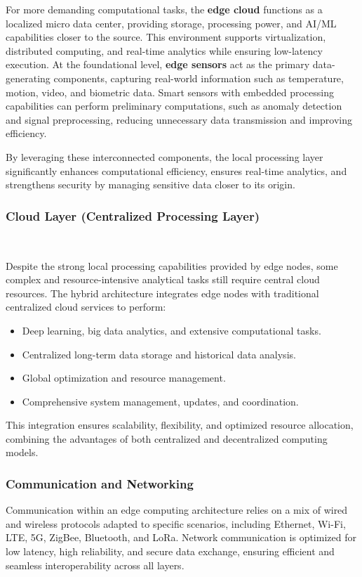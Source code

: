 \documentclass[runningheads]{llncs}
\begin{document}
For more demanding computational tasks, the \textbf{edge cloud} functions as a localized micro data center, providing storage, processing power, and AI/ML capabilities closer to the source. This environment supports virtualization, distributed computing, and real-time analytics while ensuring low-latency execution. At the foundational level, \textbf{edge sensors} act as the primary data-generating components, capturing real-world information such as temperature, motion, video, and biometric data. Smart sensors with embedded processing capabilities can perform preliminary computations, such as anomaly detection and signal preprocessing, reducing unnecessary data transmission and improving efficiency.  

By leveraging these interconnected components, the local processing layer significantly enhances computational efficiency, ensures real-time analytics, and strengthens security by managing sensitive data closer to its origin.


\subsubsection{Cloud Layer (Centralized Processing Layer)}\

\vspace{0.2cm}
Despite the strong local processing capabilities provided by edge nodes, some complex and resource-intensive analytical tasks still require central cloud resources. The hybrid architecture integrates edge nodes with traditional centralized cloud services to perform:
\begin{itemize}
    \item Deep learning, big data analytics, and extensive computational tasks.
    \item Centralized long-term data storage and historical data analysis.
    \item Global optimization and resource management.
    \item Comprehensive system management, updates, and coordination.
\end{itemize}

This integration ensures scalability, flexibility, and optimized resource allocation, combining the advantages of both centralized and decentralized computing models.

\subsubsection{Communication and Networking}
Communication within an edge computing architecture relies on a mix of wired and wireless protocols adapted to specific scenarios, including Ethernet, Wi-Fi, LTE, 5G, ZigBee, Bluetooth, and LoRa. Network communication is optimized for low latency, high reliability, and secure data exchange, ensuring efficient and seamless interoperability across all layers.
\end{document}
